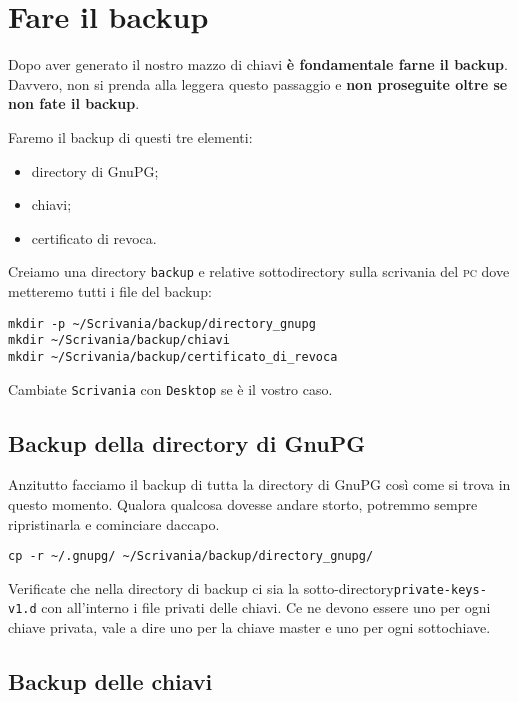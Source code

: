 \documentclass[a4paper,10pt]{article}
\begin{document}
\section{Fare il backup}

Dopo aver generato il nostro mazzo di chiavi \textbf{è fondamentale farne il backup}. Davvero, non si prenda alla leggera questo passaggio e \textbf{non proseguite oltre se non fate il backup}.

Faremo il backup di questi tre elementi:

\begin{itemize}
 \item directory di GnuPG;
 \item chiavi;
 \item certificato di revoca.
\end{itemize}

Creiamo una directory \texttt{backup} e relative sottodirectory sulla scrivania del \textsc{pc} dove metteremo tutti i file del backup:

\begin{lstlisting}
mkdir -p ~/Scrivania/backup/directory_gnupg
mkdir ~/Scrivania/backup/chiavi
mkdir ~/Scrivania/backup/certificato_di_revoca
\end{lstlisting}


Cambiate \texttt{Scrivania} con \texttt{Desktop} se è il vostro caso.

\subsection{Backup della directory di GnuPG}
\label{sec:backup-directory-gnupg}

Anzitutto facciamo il backup di tutta la directory di GnuPG così come si trova in questo momento. Qualora qualcosa dovesse andare storto, potremmo sempre ripristinarla e cominciare daccapo.

\begin{lstlisting}
cp -r ~/.gnupg/ ~/Scrivania/backup/directory_gnupg/
\end{lstlisting}

Verificate che nella directory di backup ci sia la sotto-directory\newline \texttt{private-keys-v1.d} con all'interno i file privati delle chiavi. Ce ne devono essere uno per ogni chiave privata, vale a dire uno per la chiave master e uno per ogni sottochiave.

\subsection{Backup delle chiavi}
\label{sec:backup-chiavi}
\end{document}
